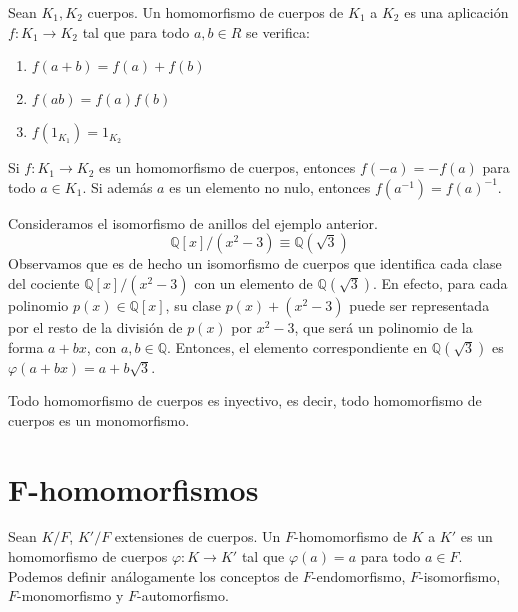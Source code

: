 \begin{definition}
    Sean $K_1, K_2$ cuerpos. Un homomorfismo de cuerpos de $K_1$ a $K_2$ es una aplicación $f : K_1 \to K_2$ tal que para todo $a, b \in R$ se verifica:
    \begin{enumerate}
        \item $f(a+b) = f(a) + f(b)$
        \item $f(ab) = f(a) f(b)$
        \item $f(1_{K_1}) = 1_{K_2}$
    \end{enumerate}
\end{definition}

\begin{remark}
    Si $f : K_1 \to K_2$ es un homomorfismo de cuerpos, entonces $f(-a) = -f(a)$ para todo $a \in K_1$.
    Si además $a$ es un elemento no nulo, entonces $f(a^{-1}) = f(a)^{-1}$.
\end{remark}

\begin{example}
    Consideramos el isomorfismo de anillos del ejemplo anterior.
    $$\mathbb{Q}[x] / (x^2 - 3) \equiv \mathbb{Q}(\sqrt{3})$$
    Observamos que es de hecho un isomorfismo de cuerpos que identifica cada clase del cociente $\mathbb{Q}[x] / (x^2 - 3)$ con un elemento de $\mathbb{Q}(\sqrt{3})$.
    En efecto, para cada polinomio $p(x) \in \mathbb{Q}[x]$, su clase $p(x) + (x^2 -3)$ puede ser representada por el resto de la división de $p(x)$ por $x^2 - 3$, que será un polinomio de la forma $a + bx$, con $a, b \in \mathbb{Q}$.
    Entonces, el elemento correspondiente en $\mathbb{Q}(\sqrt{3})$ es $\varphi(a + bx) = a + b\sqrt{3}$.
\end{example}

\begin{remark}
    Todo homomorfismo de cuerpos es inyectivo, es decir, todo homomorfismo de cuerpos es un monomorfismo.
\end{remark}

\section{F-homomorfismos}

\begin{definition}
    Sean $K/F$, $K'/F$ extensiones de cuerpos.
    Un $F$-homomorfismo de $K$ a $K'$ es un homomorfismo de cuerpos $\varphi : K \to K'$ tal que $\varphi(a) = a$ para todo $a \in F$.
    Podemos definir análogamente los conceptos de $F$-endomorfismo, $F$-isomorfismo, $F$-monomorfismo y $F$-automorfismo.
\end{definition}

